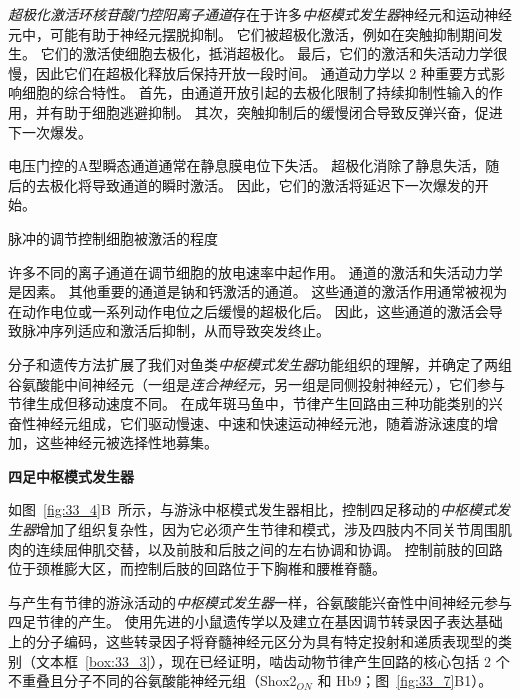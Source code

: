 \begin{proposition}[神经元离子通道有助于中枢模式发生器功能]
	\quad \quad \textit{超极化激活环核苷酸门控阳离子通道}存在于许多\textit{中枢模式发生器}神经元和运动神经元中，可能有助于神经元摆脱抑制。
	它们被超极化激活，例如在突触抑制期间发生。
	它们的激活使细胞去极化，抵消超极化。
	最后，它们的激活和失活动力学很慢，因此它们在超极化释放后保持开放一段时间。
	通道动力学以 2 种重要方式影响细胞的综合特性。
	首先，由通道开放引起的去极化限制了持续抑制性输入的作用，并有助于细胞逃避抑制。
	其次，突触抑制后的缓慢闭合导致反弹兴奋，促进下一次爆发。
	
	\quad \quad 电压门控的A型瞬态通道通常在静息膜电位下失活。
	超极化消除了静息失活，随后的去极化将导致通道的瞬时激活。
	因此，它们的激活将延迟下一次爆发的开始。
	
	\quad \quad 脉冲的调节控制细胞被激活的程度
	
	\quad \quad 许多不同的离子通道在调节细胞的放电速率中起作用。
	通道的激活和失活动力学是因素。
	其他重要的通道是钠和钙激活的通道。
	这些通道的激活作用通常被视为在动作电位或一系列动作电位之后缓慢的超极化后。
	因此，这些通道的激活会导致脉冲序列适应和激活后抑制，从而导致突发终止。
	
\end{proposition}


分子和遗传方法扩展了我们对鱼类\textit{中枢模式发生器}功能组织的理解，并确定了两组谷氨酸能中间神经元（一组是\textit{连合神经元}，另一组是同侧投射神经元），它们参与节律生成但移动速度不同。
在成年斑马鱼中，节律产生回路由三种功能类别的兴奋性神经元组成，它们驱动慢速、中速和快速运动神经元池，随着游泳速度的增加，这些神经元被选择性地募集。


\textbf{四足中枢模式发生器}

如图~\ref{fig:33_4}B~所示，与游泳中枢模式发生器相比，控制四足移动的\textit{中枢模式发生器}增加了组织复杂性，因为它必须产生节律和模式，涉及四肢内不同关节周围肌肉的连续屈伸肌交替，以及前肢和后肢之间的左右协调和协调。
控制前肢的回路位于颈椎膨大区，而控制后肢的回路位于下胸椎和腰椎脊髓。


与产生有节律的游泳活动的\textit{中枢模式发生器}一样，谷氨酸能兴奋性中间神经元参与四足节律的产生。
使用先进的小鼠遗传学以及建立在基因调节转录因子表达基础上的分子编码，这些转录因子将脊髓神经元区分为具有特定投射和递质表现型的类别（文本框~\ref{box:33_3}），现在已经证明，啮齿动物节律产生回路的核心包括 2 个不重叠且分子不同的谷氨酸能神经元组（Shox2$_{ON} $ 和 Hb9；图~\ref{fig:33_7}B1）。



